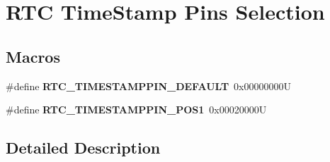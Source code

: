 \hypertarget{group___r_t_c_ex___time_stamp___pin___selection}{}\section{R\+TC Time\+Stamp Pins Selection}
\label{group___r_t_c_ex___time_stamp___pin___selection}
\subsection*{Macros}
\begin{DoxyCompactItemize}
\item 
\mbox{\label{group___r_t_c_ex___time_stamp___pin___selection_ga8ce8bdb904f1fef05ae3b59d6f59843a}} 
\#define {\bfseries R\+T\+C\+\_\+\+T\+I\+M\+E\+S\+T\+A\+M\+P\+P\+I\+N\+\_\+\+D\+E\+F\+A\+U\+LT}~0x00000000U
\item 
\mbox{\label{group___r_t_c_ex___time_stamp___pin___selection_ga66d2ca25220afef83ee3aa802216b609}} 
\#define {\bfseries R\+T\+C\+\_\+\+T\+I\+M\+E\+S\+T\+A\+M\+P\+P\+I\+N\+\_\+\+P\+O\+S1}~0x00020000U
\end{DoxyCompactItemize}


\subsection{Detailed Description}
